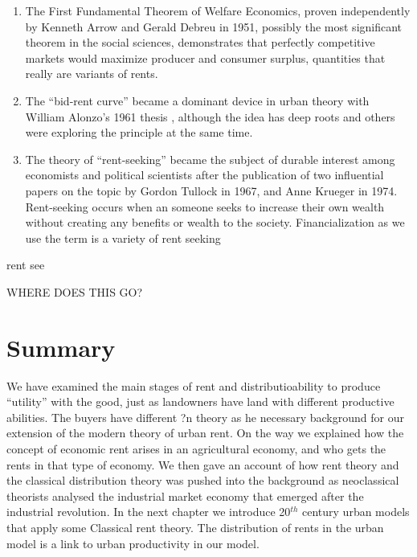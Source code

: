 \begin{enumerate}
    \item The First Fundamental Theorem of Welfare Economics, proven independently by Kenneth Arrow \cite{arrowExtensionBasicTheorems1951}and  Gerald Debreu \cite{debreuCoefficientResourceUtilization1951}  in 1951, possibly the most significant theorem in the social sciences,   demonstrates that perfectly competitive markets would maximize producer and consumer surplus, quantities that really are variants of rents.
    \item The ``\gls{bid-rent curve}'' became a dominant device  in urban theory with William Alonzo's 1961 thesis \cite{alonzoTheoryUrbanLand1960}, although the idea has deep roots and others were exploring the principle at the same time.  
    \item The theory of ``\gls{rent-seeking}''   became the subject of durable interest among economists and political scientists after the publication of two influential papers on the topic by Gordon Tullock in 1967\cite{tullockWELFARECOSTSTARIFFS1967}, and Anne Krueger \cite{kruegerPoliticalEconomyRentSeeking1974} in 1974. Rent-seeking occurs when an someone seeks to increase their own wealth without creating any benefits or wealth to the society. Financialization as we use the term is a variety of rent seeking
\end{enumerate}rent see


WHERE DOES THIS GO?


\section{Summary}
We have examined the main stages  of rent and distributioability to produce ``utility'' with the good, just as landowners have land with different productive abilities. The buyers have different ?n theory 
as he necessary background for our extension of the modern theory of urban rent. On the way we explained  how the concept of economic rent arises in an agricultural economy, and who gets the rents in that type of economy. We then gave an account of how rent theory and the classical distribution theory was pushed into the background as neoclassical theorists analysed the  industrial market economy that emerged after the industrial revolution. In the next chapter we introduce 20$^{th}$ century urban models that apply some Classical  rent theory. The distribution of rents in the urban model is a link to urban productivity in our model.

